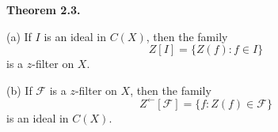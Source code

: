 \textbf{Theorem 2.3.}

(a) If $I$ is an ideal in $C(X)$, then the family
$$Z[I] = \{Z(f): f \in I\}$$
is a $z$-filter on $X$.

(b) If $\mathcal{F}$ is a $z$-filter on $X$, then the family
$$Z^{\leftarrow}[\mathcal{F}] = \{f: Z(f) \in \mathcal{F}\}$$
is an ideal in $C(X)$.
